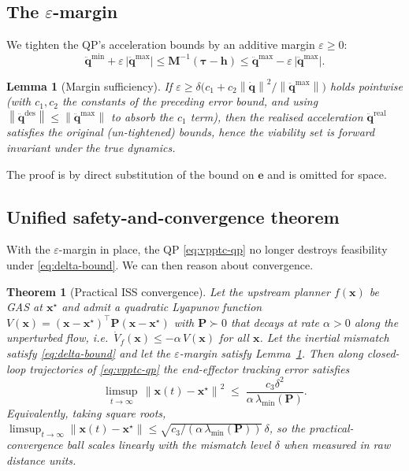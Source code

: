 \documentclass[10pt,conference]{IEEEtran}
\newcommand{\bx}{\bm{x}}
\newcommand{\bdq}{\dot{\bm{q}}}
\newcommand{\bddq}{\ddot{\bm{q}}}
\newcommand{\btau}{\bm{\tau}}
\newcommand{\bM}{\bm{M}}
\newcommand{\bh}{\bm{h}}
\newcommand{\bP}{\bm{P}}
\newcommand{\norm}[1]{\left\lVert #1 \right\rVert}
\newtheorem{theorem}{Theorem}
\newtheorem{lemma}{Lemma}
\theoremstyle{remark}
\theoremstyle{plain}
\begin{document}
\subsection{The $\varepsilon$-margin}
\label{sec:eps-margin}
We tighten the QP's acceleration bounds by an additive margin
$\varepsilon\!\ge\!0$:
\begin{equation}
    \bddq^{\min} + \varepsilon\,\lvert\bddq^{\max}\rvert
    \le \bM^{-1}(\btau-\bh) \le
    \bddq^{\max} - \varepsilon\,\lvert\bddq^{\max}\rvert.
    \label{eq:eps-bounds}
\end{equation}
\begin{lemma}[Margin sufficiency]
\label{lem:margin}
If $\varepsilon \ge \delta\bigl(c_1 + c_2\norm{\bdq}^2/
                              \norm{\bddq^{\max}}\bigr)$
holds pointwise (with $c_1, c_2$ the constants of the
preceding error bound, and using $\norm{\bddq^{\text{des}}}\le
\norm{\bddq^{\max}}$ to absorb the $c_1$ term), then the realised
acceleration $\bddq^{\text{real}}$ satisfies the original
(un-tightened) bounds, hence the viability set is forward
invariant under the true dynamics.
\end{lemma}

The proof is by direct substitution of the bound on $\bm{e}$ and
is omitted for space.

\subsection{Unified safety-and-convergence theorem}
\label{sec:unified}
With the $\varepsilon$-margin in place, the QP
\eqref{eq:vpptc-qp} no longer destroys feasibility under
\eqref{eq:delta-bound}. We can then reason about convergence.

\begin{theorem}[Practical ISS convergence]
\label{thm:iss}
Let the upstream planner $f(\bx)$ be GAS at $\bx^\star$ and
admit a quadratic Lyapunov function
$V(\bx)=(\bx-\bx^\star)^\top \bP(\bx-\bx^\star)$ with $\bP\succ 0$
that decays at rate $\alpha>0$ along the unperturbed flow,
\emph{i.e.}\ $\dot V_{\!f}(\bx) \le -\alpha\, V(\bx)$ for all
$\bx$.
Let the inertial mismatch satisfy \eqref{eq:delta-bound} and let
the $\varepsilon$-margin satisfy Lemma~\ref{lem:margin}. Then
along closed-loop trajectories of \eqref{eq:vpptc-qp} the
end-effector tracking error satisfies
\begin{equation}
    \limsup_{t\to\infty}\,\norm{\bx(t)-\bx^\star}^2
    \;\le\; \frac{c_3 \delta^2}{\alpha\,\lambda_{\min}(\bP)}.
    \label{eq:iss-bound}
\end{equation}
Equivalently, taking square roots,
$\limsup_{t\to\infty}\norm{\bx(t)-\bx^\star}
 \le \sqrt{c_3/(\alpha\,\lambda_{\min}(\bP))}\,\delta$,
so the practical-convergence ball scales \emph{linearly} with the
mismatch level $\delta$ when measured in raw distance units.
\end{theorem}
\end{document}
